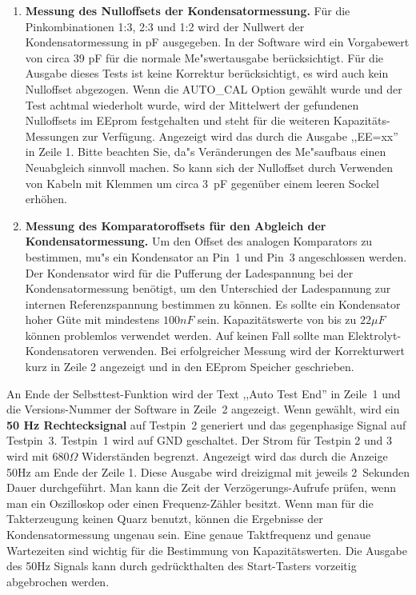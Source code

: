\begin{enumerate}
\item {\bf Messung des Nulloffsets der Kondensatormessung.}
F\"ur die Pinkombinationen 1:3, 2:3 und 1:2 wird der Nullwert der Kondensatormessung in pF ausgegeben.
In der Software wird ein Vorgabewert von circa 39 pF f\"ur die normale Me"swertausgabe ber\"ucksichtigt.
F\"ur die Ausgabe dieses Tests ist keine Korrektur ber\"ucksichtigt, es wird auch kein Nulloffset abgezogen.
Wenn die AUTO\_CAL Option gew\"ahlt wurde und der Test achtmal wiederholt wurde, wird der Mittelwert
der gefundenen Nulloffsets im EEprom festgehalten und steht f\"ur die weiteren Kapazit\"ats-Messungen zur Verf\"ugung.
Angezeigt wird das durch die Ausgabe ,,EE=xx''  in Zeile 1.
Bitte beachten Sie, da"s Ver\"anderungen des Me"saufbaus einen Neuabgleich sinnvoll machen.
So kann sich der Nulloffset durch Verwenden von Kabeln mit Klemmen um circa 3~pF gegen\"uber einem leeren
Sockel erh\"ohen.

\item {\bf Messung des Komparatoroffsets f\"ur den Abgleich der Kondensatormessung.}
Um den Offset des analogen Komparators zu bestimmen, mu"s ein Kondensator an Pin~1 und Pin~3 angeschlossen werden.
Der Kondensator wird f\"ur die Pufferung der Ladespannung bei der Kondensatormessung ben\"otigt, um den Unterschied der 
Ladespannung zur internen Referenzspannung bestimmen zu k\"onnen. Es sollte ein Kondensator hoher G\"ute mit
mindestens \(100 nF\) sein. Kapazit\"atswerte von bis zu \(22 \mu F\) k\"onnen problemlos verwendet werden.
Auf keinen Fall sollte man Elektrolyt-Kondensatoren verwenden.
Bei erfolgreicher Messung wird der Korrekturwert kurz in Zeile 2 angezeigt und in den EEprom Speicher geschrieben.

\end{enumerate}

An Ende der Selbsttest-Funktion wird der Text ,,Auto Test End'' in Zeile~1 und die Versions-Nummer der Software in Zeile~2 angezeigt.
Wenn gew\"ahlt, wird ein {\bf 50 Hz Rechtecksignal} auf Testpin~2 generiert und das gegenphasige Signal auf Testpin~3.
Testpin~1 wird auf GND geschaltet. Der Strom f\"ur Testpin 2 und 3 wird mit \(680\Omega\) Widerst\"anden begrenzt.
Angezeigt wird das durch die Anzeige 50Hz am Ende der Zeile 1.
Diese Ausgabe wird dreizigmal mit jeweils 2~Sekunden Dauer durchgef\"uhrt.
Man kann die Zeit der Verz\"ogerungs-Aufrufe pr\"ufen, wenn man ein Oszilloskop oder einen
Frequenz-Z\"ahler besitzt.
Wenn man f\"ur die Takterzeugung keinen Quarz benutzt, k\"onnen die
Ergebnisse der Kondensatormessung ungenau sein.
Eine genaue Taktfrequenz und genaue Wartezeiten sind wichtig f\"ur die Bestimmung von Kapazit\"atswerten.
Die Ausgabe des 50Hz Signals kann durch gedr\"uckthalten des Start-Tasters vorzeitig abgebrochen werden.

